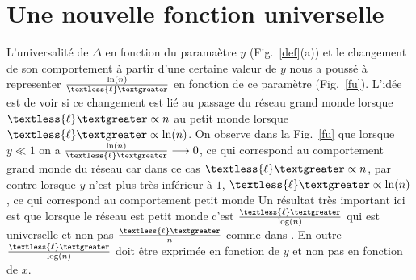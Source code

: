 \section{Une nouvelle fonction universelle }
L'universalité de $\Delta$ en fonction du paramaètre $y$ (Fig.~\ref{def}(a)) et le changement de son comportement à partir d'une certaine valeur de $y$ nous a poussé à representer $\frac{\ln(n)}{\textless {\ell} \textgreater}$ en fonction de ce paramètre (Fig.~\ref{fu}). L'idée est de voir si ce changement est lié au passage du réseau grand monde lorsque $\textless {\ell} \textgreater \propto n $ au petit monde lorsque $\textless {\ell} \textgreater \propto \ln(n)$. On observe dans la Fig.~\ref{fu} que lorsque $y\ll1$ on a $\frac{\ln(n)}{\textless {\ell} \textgreater}\longrightarrow 0$, ce qui correspond au comportement grand monde du réseau car dans ce cas $\textless {\ell} \textgreater \propto n$, par contre lorsque $y$ n'est plus très inférieur à $1$, $\textless {\ell} \textgreater \propto \ln(n)$, ce qui correspond au comportement petit monde Un résultat très important ici est que lorsque le réseau est petit monde c'est $\frac{\textless {\ell} \textgreater}{\log(n)}$ qui est universelle et non pas $\frac{\textless {\ell} \textgreater}{n}$ comme dans \cite{Newman-Watts1999-2}. En outre $\frac{\textless {\ell} \textgreater}{\log(n)}$ doit être exprimée en fonction de $y$ et non pas en fonction de $x$.
